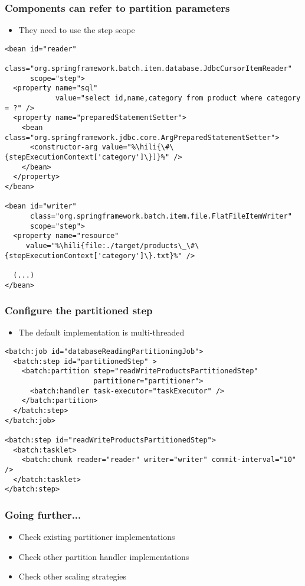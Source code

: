 \begin{frame}[fragile]
\frametitle{Components can refer to partition parameters}
\begin{itemize}
 \item They need to use the step scope 
\end{itemize}

\lstset{language=XML}
\begin{lstlisting}
<bean id="reader" 
      class="org.springframework.batch.item.database.JdbcCursorItemReader" 
      scope="step">
  <property name="sql" 
            value="select id,name,category from product where category = ?" />
  <property name="preparedStatementSetter">
    <bean class="org.springframework.jdbc.core.ArgPreparedStatementSetter">
      <constructor-arg value="%\hili{\#\{stepExecutionContext['category']\}]}%" />
    </bean>
  </property>
</bean>

<bean id="writer" 
      class="org.springframework.batch.item.file.FlatFileItemWriter" 
      scope="step">
  <property name="resource"
     value="%\hili{file:./target/products\_\#\{stepExecutionContext['category']\}.txt}%" />
 
  (...)
</bean>
\end{lstlisting}
\end{frame}

\begin{frame}[fragile]
\frametitle{Configure the partitioned step}
\begin{itemize}
 \item The default implementation is multi-threaded
\end{itemize}

\lstset{language=XML}
\begin{lstlisting}
<batch:job id="databaseReadingPartitioningJob">
  <batch:step id="partitionedStep" >
    <batch:partition step="readWriteProductsPartitionedStep" 
                     partitioner="partitioner">
      <batch:handler task-executor="taskExecutor" />
    </batch:partition>
  </batch:step>
</batch:job>

<batch:step id="readWriteProductsPartitionedStep">
  <batch:tasklet>
    <batch:chunk reader="reader" writer="writer" commit-interval="10" />
  </batch:tasklet>	
</batch:step>
\end{lstlisting}
\end{frame}

\begin{frame}
 \frametitle{Going further...}
 \begin{itemize}
  \item Check existing partitioner implementations
  \item Check other partition handler implementations
  \item Check other scaling strategies
 \end{itemize}
\end{frame}

